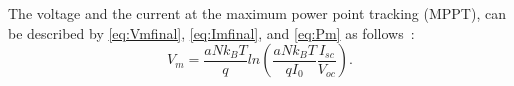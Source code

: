 \documentclass[review]{elsarticle}
\begin{document}
%
%
%
%
%
%
%
%
The voltage and the current at the maximum power point tracking (MPPT), can be described by \eqref{eq:Vmfinal}, \eqref{eq:Imfinal}, and \eqref{eq:Pm}  as follows~\cite{Saloux}: %
\begin{equation}
\label{eq:Vmfinal}
V_{m}=\dfrac{aNk_{B}T}{q} ln \left( \dfrac{aNk_{B}T}{qI_{0}} \dfrac{I_{sc}}{V_{oc}}  \right). 
\end{equation}
\end{document}
